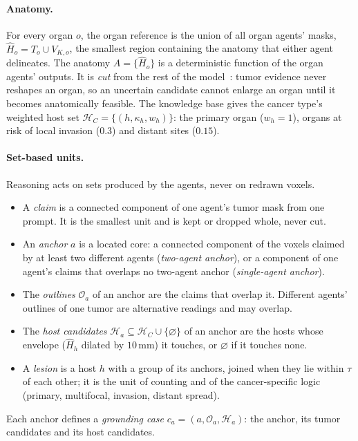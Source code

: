 \documentclass[fleqn,10pt]{olplainarticle}
\begin{document}
\paragraph{Anatomy.}
For every organ $o$, the organ reference is the union of all organ agents' masks, $\hat H_o=T_o\cup V_{K,o}$, the smallest
region containing the anatomy that either agent delineates. The anatomy $A=\{\hat H_o\}$ is a deterministic function of
the organ agents' outputs. It is \emph{cut} from the rest of the model~\cite{liu2009modularization,plummer2015cuts,jacob2017better}:
tumor evidence never reshapes an organ, so an uncertain candidate cannot enlarge an organ until it becomes anatomically
feasible. The knowledge base gives the cancer type's weighted host set
$\mathcal{H}_C=\{(h,\kappa_h,w_h)\}$: the primary organ ($w_h=1$), organs at risk of local invasion ($0.3$) and distant
sites ($0.15$).

\paragraph{Set-based units.}
Reasoning acts on sets produced by the agents, never on redrawn voxels.
\begin{itemize}
\item A \emph{claim} is a connected component of one agent's tumor mask from one prompt. It is the smallest unit and is
kept or dropped whole, never cut.
\item An \emph{anchor} $a$ is a located core: a connected component of the voxels claimed by at least two different
agents (\emph{two-agent anchor}), or a component of one agent's claims that overlaps no two-agent anchor
(\emph{single-agent anchor}).
\item The \emph{outlines} $\mathcal{O}_a$ of an anchor are the claims that overlap it. Different agents' outlines of one
tumor are alternative readings and may overlap.
\item The \emph{host candidates} $\mathcal{H}_a\subseteq\mathcal{H}_C\cup\{\varnothing\}$ of an anchor are the hosts whose
envelope ($\hat H_h$ dilated by $10$\,mm) it touches, or $\varnothing$ if it touches none.
\item A \emph{lesion} is a host $h$ with a group of its anchors, joined when they lie within $\tau$ of each other; it is the
unit of counting and of the cancer-specific logic (primary, multifocal, invasion, distant spread).
\end{itemize}
Each anchor defines a \emph{grounding case} $c_a=(a,\mathcal{O}_a,\mathcal{H}_a)$: the anchor, its tumor candidates and
its host candidates.
\end{document}
